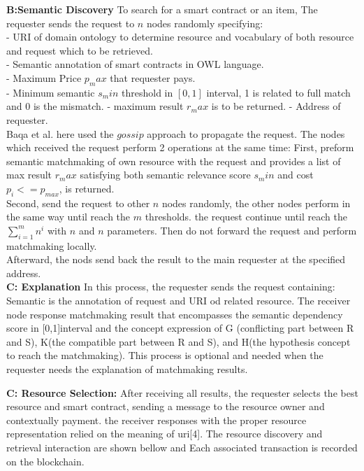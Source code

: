 \textbf{B:Semantic Discovery }
To search for a smart contract or an item, The requester sends the request to $n$ nodes randomly specifying:\\
- URI of domain ontology to determine resource and vocabulary of both resource and request which to be retrieved.\\
- Semantic annotation of smart contracts in OWL language. \\
- Maximum Price $p_max$ that requester pays.\\
- Minimum semantic $s_min$ threshold in $[0,1]$ interval, 1 is related to full match and 0 is the mismatch. 
- maximum result $r_max$ is to be returned.
- Address of requester. \\ 
Baqa et al. here used the $gossip$ approach to propagate the request. The nodes which received the request perform 2 operations at the same time: First, preform semantic matchmaking of own resource with the request and provides a list of max result $r_max$ satisfying both semantic relevance score $s_min$ and cost $p_i <= p_{max}$, is returned.\\
Second, send the request to other $n$ nodes randomly, the other nodes perform in the same way until reach the $m$ thresholds. the request continue until reach the $\sum_{i=1}^{m} n^i$ with $n$ and $n$ parameters. Then do not forward the request and perform matchmaking locally.\\
Afterward, the nods send back the result to the main requester at the specified address\cite{Baqa}.\\

\textbf{C: Explanation} In this process, the requester sends the request containing: Semantic is the annotation of request and URI od related resource. The receiver node response matchmaking result that encompasses the semantic dependency score in [0,1]interval and the concept expression of G (conflicting part between R and S), K(the compatible part between R and S), and H(the hypothesis concept to reach the matchmaking). This process is optional and needed when the requester needs the explanation of matchmaking results.

\textbf{C: Resource Selection:} After receiving all results, the requester selects the best resource and smart contract, sending a message to the resource owner and contextually payment. the receiver responses with the proper resource representation relied on the meaning of uri[4].
The resource discovery and retrieval interaction are shown bellow and Each associated transaction is recorded on the blockchain\cite{Ruta}.


